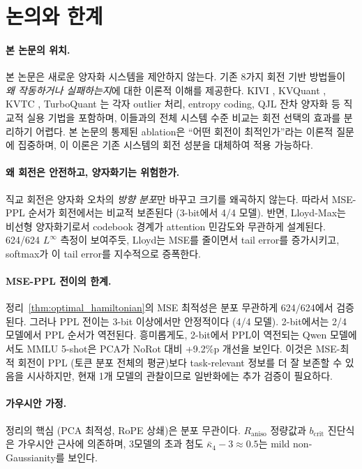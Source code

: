 \section{논의와 한계}
\label{sec:discussion}

\paragraph{본 논문의 위치.}
본 논문은 새로운 양자화 시스템을 제안하지 않는다. 기존 8가지 회전 기반 방법들이 \emph{왜 작동하거나 실패하는지}에 대한 이론적 이해를 제공한다. KIVI \citep{liu2024kivi}, KVQuant \citep{hooper2024kvquant}, KVTC \citep{staniszewski2025kvtc}, TurboQuant \citep{zandieh2025turboquant}는 각자 outlier 처리, entropy coding, QJL 잔차 양자화 등 직교적 실용 기법을 포함하며, 이들과의 전체 시스템 수준 비교는 회전 선택의 효과를 분리하기 어렵다. 본 논문의 통제된 ablation은 ``어떤 회전이 최적인가''라는 이론적 질문에 집중하며, 이 이론은 기존 시스템의 회전 성분을 대체하여 적용 가능하다.

\paragraph{왜 회전은 안전하고, 양자화기는 위험한가.}
직교 회전은 양자화 오차의 \emph{방향 분포}만 바꾸고 크기를 왜곡하지 않는다. 따라서 MSE-PPL 순서가 회전에서는 비교적 보존된다 (3-bit에서 4/4 모델). 반면, Lloyd-Max는 비선형 양자화기로서 codebook 경계가 attention 민감도와 무관하게 설계된다. 624/624 $L^\infty$ 측정이 보여주듯, Lloyd는 MSE를 줄이면서 tail error를 증가시키고, softmax가 이 tail error를 지수적으로 증폭한다.

\paragraph{MSE-PPL 전이의 한계.}
정리~\ref{thm:optimal_hamiltonian}의 MSE 최적성은 분포 무관하게 624/624에서 검증된다. 그러나 PPL 전이는 3-bit 이상에서만 안정적이다 (4/4 모델). 2-bit에서는 2/4 모델에서 PPL 순서가 역전된다. 흥미롭게도, 2-bit에서 PPL이 역전되는 Qwen 모델에서도 MMLU 5-shot은 PCA가 NoRot 대비 +9.2\%p 개선을 보인다. 이것은 MSE-최적 회전이 PPL (토큰 분포 전체의 평균)보다 task-relevant 정보를 더 잘 보존할 수 있음을 시사하지만, 현재 1개 모델의 관찰이므로 일반화에는 추가 검증이 필요하다.

\paragraph{가우시안 가정.}
정리의 핵심 (PCA 최적성, RoPE 상쇄)은 분포 무관이다. $R_{\mathrm{aniso}}$ 정량값과 $b_{\mathrm{crit}}$ 진단식은 가우시안 근사에 의존하며, 3모델의 초과 첨도 $\bar{\kappa}_4 - 3 \approx 0.5$는 mild non-Gaussianity를 보인다.


